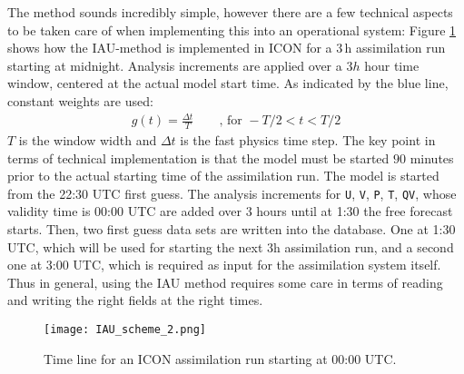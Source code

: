 The method sounds incredibly simple, however there are a few technical aspects to be taken care of when implementing this into an operational 
system: Figure \ref{fig_IAU_scheme} shows how the IAU-method is implemented in ICON for a $3\,\mathrm{h}$ assimilation run starting at midnight. 
Analysis increments are applied over a $3h$ hour time window, centered at the actual model start time. As indicated by the blue line, constant 
weights are used:
\begin{align}
 g(t) = \frac{\Delta t}{T}\qquad \text{, for } -T/2 < t < T/2
\end{align}
$T$ is the window width and $\Delta t$ is the fast physics time step. The key point in terms of technical implementation is that the model 
must be started $90$ minutes prior to the actual starting time of the assimilation run. The model is started from the 22:30 UTC first guess. 
The analysis increments for \texttt{U}, \texttt{V}, \texttt{P}, \texttt{T}, \texttt{QV}, whose validity time is 00:00 UTC are added over 
$3$ hours until at 1:30 the free forecast starts. Then, two first guess data sets are written into the database. One at 1:30 UTC, which will 
be used for starting the next 3h assimilation run, and a second one at 3:00 UTC, which is required as input for the assimilation system 
itself. Thus in general, using the IAU method requires some care in terms of reading and writing the right fields at the right times.
\begin{figure}[hbt]
 \centering
 \texttt{[image: IAU\_scheme\_2.png]}
 \caption{Time line for an ICON assimilation run starting at 00:00 UTC.}\label{fig_IAU_scheme}
\end{figure}

